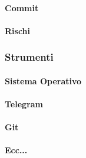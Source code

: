  \paragraph{Commit}
 \paragraph{Rischi} 
\subsubsection{Strumenti}
 \paragraph{Sistema Operativo}
 \paragraph{Telegram}
 \paragraph{Git}
 \paragraph{Ecc...}